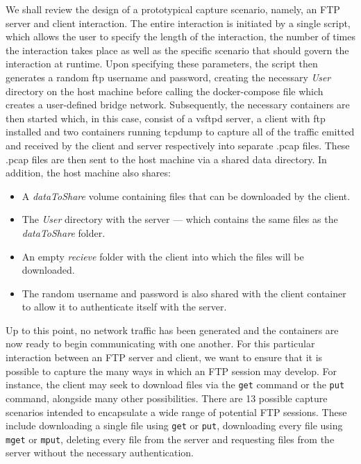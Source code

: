 \documentclass[sigconf,anonymous]{acmart}\usepackage[]{graphicx}\usepackage[]{color}
\begin{document}
We shall review the design of a prototypical capture scenario, namely, an FTP server and client interaction. The entire interaction is initiated by a single script, which allows the user to specify the length of the interaction, the number of times the interaction takes place as well as the specific scenario that should govern the interaction at runtime. Upon specifying these parameters, the script then generates a random ftp username and password, creating the necessary \textit{User} directory on the host machine before calling the docker-compose file which creates a user-defined bridge network. Subsequently, the necessary containers are then started which, in this case, consist of a vsftpd server, a client with ftp installed and two containers running tcpdump to capture all of the traffic emitted and received by the client and server respectively into separate .pcap files. These .pcap files are then sent to the host machine via a shared data directory. In addition, the host machine also shares:
    
\begin{itemize}
\item A \textit{dataToShare} volume containing files that can be downloaded by the client.
\item The \textit{User} directory with the server --- which contains the same files as the \textit{dataToShare} folder.
\item An empty \textit{recieve} folder with the client into which the files will be downloaded.
\item The random username and password is also shared with the client container to allow it to authenticate itself with the server.
\end{itemize}
    
    Up to this point, no network traffic has been generated and the containers are now ready to begin communicating with one another. 
    For this particular interaction between an FTP server and client, we want to ensure that it is possible to capture the many ways in which an FTP session may develop. For instance, the client may seek to download files via the \texttt{get} command or the \texttt{put} command, alongside many other possibilities. There are 13 possible capture scenarios intended to encapsulate a wide range of potential FTP sessions. These include downloading a single file using \texttt{get} or \texttt{put}, downloading every file using \texttt{mget} or \texttt{mput}, deleting every file from the server and requesting files from the server without the necessary authentication.
\end{document}
